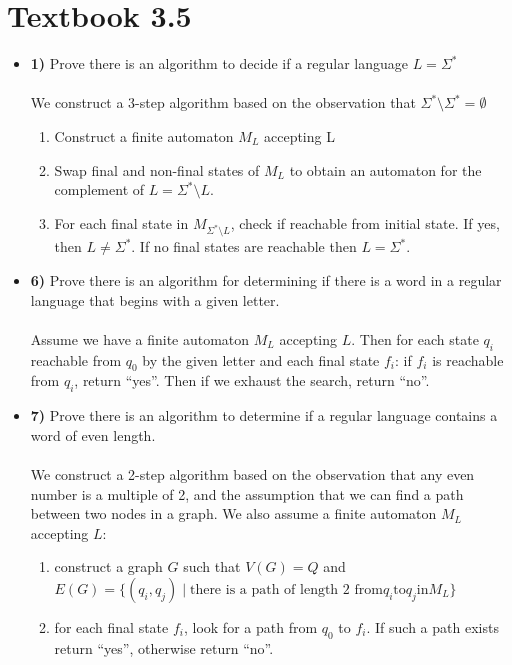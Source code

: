 \documentclass[defaultpackages]{simplereport}
\begin{document}
\section*{Textbook 3.5}
\begin{itemize}[label=]
  \item \textbf{1)} Prove there is an algorithm to decide if a regular language $L = \Sigma^*$\\\\
    We construct a 3-step algorithm based on the observation that $\Sigma^*
    \setminus \Sigma^* = \emptyset$
    \begin{enumerate}
    \item Construct a finite automaton $M_L$ accepting L
    \item Swap final and non-final states of $M_L$ to obtain an automaton for the complement of $L = \Sigma^* \setminus L$.
    \item For each final state in $M_{\Sigma^* \setminus L}$, check if reachable
      from initial state. If yes, then $L \neq \Sigma^*$. If no final states
      are reachable then $L = \Sigma^*$.
    \end{enumerate}
  \item \textbf{6)} Prove there is an algorithm for determining if there is a
    word in a regular language that begins with a given letter.\\\\
    Assume we have a finite automaton $M_L$ accepting $L$. Then for each state
    $q_i$ reachable from $q_0$ by the given letter and each final state $f_i$:
    if $f_i$ is reachable from $q_i$, return ``yes''. Then if we exhaust the
    search, return ``no''. 
  \item \textbf{7)} Prove there is an algorithm to determine if a regular
    language contains a word of even length.\\\\
    We construct a 2-step algorithm based on the observation that any even
    number is a multiple of 2, and the assumption that we can find a path
    between two nodes in a graph. We also assume a finite automaton $M_L$
    accepting $L$:
    \begin{enumerate}
      \item construct a graph $G$ such that $V(G) = Q$ and $E(G) = \{(q_i, q_j)
        \mid \text{there is a path of length 2 from} q_i \text{to} q_j \text{in}
        M_L\}$
       \item for each final state $f_i$, look for a path from $q_0$ to $f_i$. If
         such a path exists return ``yes'', otherwise return ``no''. 
      \end{enumerate}
\end{itemize}
\end{document}
